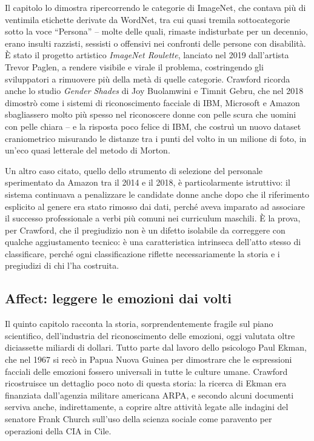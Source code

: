 \documentclass[a4paper,11pt]{article}
\begin{document}
Il capitolo lo dimostra ripercorrendo le categorie di ImageNet, che contava più di ventimila etichette derivate da WordNet, tra cui quasi tremila sottocategorie sotto la voce ``Persona'' -- molte delle quali, rimaste indisturbate per un decennio, erano insulti razzisti, sessisti o offensivi nei confronti delle persone con disabilità. È stato il progetto artistico \emph{ImageNet Roulette}, lanciato nel 2019 dall'artista Trevor Paglen, a rendere visibile e virale il problema, costringendo gli sviluppatori a rimuovere più della metà di quelle categorie. Crawford ricorda anche lo studio \emph{Gender Shades} di Joy Buolamwini e Timnit Gebru, che nel 2018 dimostrò come i sistemi di riconoscimento facciale di IBM, Microsoft e Amazon sbagliassero molto più spesso nel riconoscere donne con pelle scura che uomini con pelle chiara -- e la risposta poco felice di IBM, che costruì un nuovo dataset craniometrico misurando le distanze tra i punti del volto in un milione di foto, in un'eco quasi letterale del metodo di Morton.

Un altro caso citato, quello dello strumento di selezione del personale sperimentato da Amazon tra il 2014 e il 2018, è particolarmente istruttivo: il sistema continuava a penalizzare le candidate donne anche dopo che il riferimento esplicito al genere era stato rimosso dai dati, perché aveva imparato ad associare il successo professionale a verbi più comuni nei curriculum maschili. È la prova, per Crawford, che il pregiudizio non è un difetto isolabile da correggere con qualche aggiustamento tecnico: è una caratteristica intrinseca dell'atto stesso di classificare, perché ogni classificazione riflette necessariamente la storia e i pregiudizi di chi l'ha costruita.

\subsection{Affect: leggere le emozioni dai volti}

Il quinto capitolo racconta la storia, sorprendentemente fragile sul piano scientifico, dell'industria del riconoscimento delle emozioni, oggi valutata oltre diciassette miliardi di dollari. Tutto parte dal lavoro dello psicologo Paul Ekman, che nel 1967 si recò in Papua Nuova Guinea per dimostrare che le espressioni facciali delle emozioni fossero universali in tutte le culture umane. Crawford ricostruisce un dettaglio poco noto di questa storia: la ricerca di Ekman era finanziata dall'agenzia militare americana ARPA, e secondo alcuni documenti serviva anche, indirettamente, a coprire altre attività legate alle indagini del senatore Frank Church sull'uso della scienza sociale come paravento per operazioni della CIA in Cile.
\end{document}
